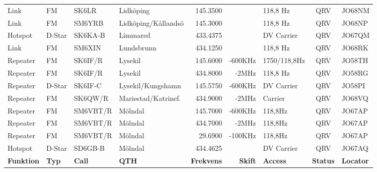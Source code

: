 \begin{landscape}
\begin{longtable}{llllrrlcl}
	Link              & FM           & SK6LR         & Lidköping           &          145.3500 &                & 118,8 Hz        &       QRV       & JO68NM           \\
	Link              & FM           & SM6YRB        & Lidköping/Kållandsö &          145.3000 &                & 118,8 Hz        &       QRV       & JO68NP           \\
	Hotspot           & D-Star       & SK6KA-B       & Limmared            &          433.4375 &                & DV Carrier      &       QRV       & JO67QM           \\
	Link              & FM           & SM6XIN        & Lundsbrunn          &          434.1250 &                & 118,8 Hz        &       QRV       & JO68RK           \\
	Repeater          & FM           & SK6IF/R       & Lysekil             &          145.6000 &        -600KHz & 1750/118,8Hz    &       QRV       & JO58TH           \\
	Repeater          & FM           & SK6IF/R       & Lysekil             &          434.8000 &          -2MHz & 118,8 Hz        &       QRV       & JO58RG           \\
	Repeater          & D-Star       & SK6IF-C       & Lysekil/Kungshamn   &          145.5750 &        -600KHz & DV Carrier      &       QRV       & JO58PI           \\
	Repeater          & FM           & SK6QW/R       & Mariestad/Katrinef. &          434.9000 &          -2MHz & Carrier         &       QRV       & JO68VQ           \\
	Repeater          & FM           & SM6VBT/R      & Mölndal             &          145.7000 &        -600KHz & 118,8Hz         &       QRV       & JO67AP           \\
	Repeater          & FM           & SM6VBT/R      & Mölndal             &          434.7000 &          -2MHz & 118,8Hz         &       QRV       & JO67AP           \\
	Repeater          & FM           & SM6VBT/R      & Mölndal             &           29.6900 &        -100KHz & 118,8Hz         &       QRV       & JO67AP           \\
	Hotspot           & D-Star       & SD6GB-B       & Mölndal             &          434.4625 &                & DV Carrier      &       QRV       & JO67AQ           \\
		\textbf{Funktion} & \textbf{Typ} & \textbf{Call} & \textbf{QTH}        & \textbf{Frekvens} & \textbf{Skift} & \textbf{Access} & \textbf{Status} & \textbf{Locator} \\ \hline

\end{longtable}
\end{landscape}
